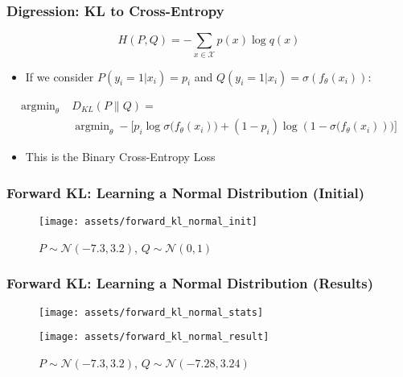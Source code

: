 \documentclass{beamer}
\DeclareMathOperator*{\argmin}{argmin}
\begin{document}
\begin{frame}
  \frametitle{Digression: KL to Cross-Entropy}
  \begin{equation*}
    H(P, Q) = - \sum_{x \in \mathcal {X}} p(x) \log q(x)
  \end{equation*}
  \begin{itemize}
    \item If we consider $P(y_i = 1 | x_i) = p_i$ and $Q(y_i = 1 | x_i) = \sigma(f_\theta (x_i))$:
  \end{itemize}
  \begin{equation*}
    \begin{aligned}
      \argmin_{\theta} \; & D_{KL} (P \parallel Q) = \\
        & \argmin_{\theta} - \Big[ p_i \log \sigma\big(f_\theta (x_i)\big) + (1 - p_i) \log (1 - \sigma \big(f_\theta (x_i))\big) \Big]
    \end{aligned}
  \end{equation*}
  \begin{itemize}
    \item This is the Binary Cross-Entropy Loss
  \end{itemize}
\end{frame}


\begin{frame}
  \frametitle{Forward KL: Learning a Normal Distribution (Initial)}
  \begin{figure}
    \centering
    \texttt{[image: assets/forward\_kl\_normal\_init]}
    \caption{$P \sim \mathcal{N}(-7.3, 3.2)$, $Q \sim \mathcal{N}(0, 1)$}
  \end{figure}
\end{frame}

\begin{frame}
  \frametitle{Forward KL: Learning a Normal Distribution (Results)}
  \begin{figure}
    \centering
    \texttt{[image: assets/forward\_kl\_normal\_stats]}
  \end{figure}
  \begin{figure}
    \centering
    \texttt{[image: assets/forward\_kl\_normal\_result]}
    \caption{$P \sim \mathcal{N}(-7.3, 3.2)$, $Q \sim \mathcal{N}(-7.28, 3.24)$}
  \end{figure}
\end{frame}
\end{document}

